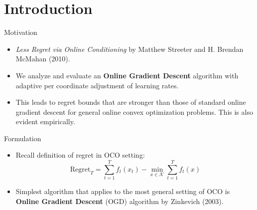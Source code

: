 \documentclass[
	11pt, %
]{beamer}
\begin{document}


\section{Introduction}

\begin{frame}{Motivation}
    \begin{itemize}
        \item \emph{Less Regret via Online Conditioning} by Matthew Streeter and H. Brendan McMahan (2010).
        \item We analyze and evaluate an \textbf{Online Gradient Descent} algorithm with adaptive per coordinate adjustment of learning rates.
        \item This leads to regret bounds that are stronger than those of standard online gradient descent for general online convex optimization problems. This is also evident empirically.
    \end{itemize}
\end{frame}

\begin{frame}{Formulation}
    \begin{itemize}
        \item Recall definition of regret in OCO setting:
        $$
        \text{Regret}_T = \sum_{t = 1}^{T} f_{t} (x_t) - \min_{x\in \mathcal{K} } \sum_{t = 1}^{T} f_{t} (x)
        $$
        \item Simplest algorithm that applies to the most general setting of OCO is \textbf{Online Gradient Descent} (OGD) algorithm by Zinkevich (2003). 
    \end{itemize}
\end{frame}
\end{document}
